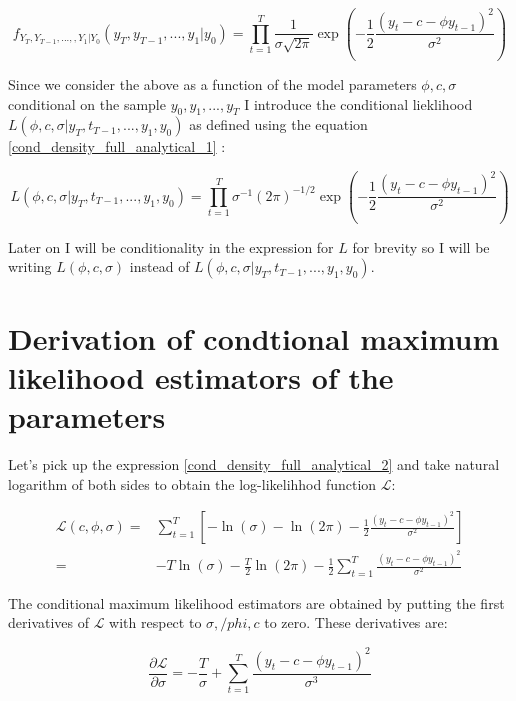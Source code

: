 \documentclass[12pt]{article}
\begin{document}
\begin{equation}
\label{cond_density_full_analytical_1}
f_{Y_T, Y_{T-1}, ..., ,Y_1 | Y_0}(y_T, y_{T-1}, ..., y_1 | y_0) = 
\prod_{t=1}^{T} \frac{1}{\sigma \sqrt{2\pi}} \exp \left(
-\frac{1}{2} \frac{(y_t - c - \phi y_{t-1})^2}{\sigma^2}
\right)
\end{equation}

Since we consider the above as a function of the model parameters 
$\phi, c, \sigma$ conditional on the sample $y_0, y_1, ..., y_T$ I introduce 
the conditional lieklihood $L(\phi, c, \sigma | y_T, t_{T-1}, ..., y_1, y_0)$ as defined 
using the equation \eqref{cond_density_full_analytical_1} :

\begin{equation}
\label{cond_density_full_analytical_2}
L(\phi, c, \sigma | y_T, t_{T-1}, ..., y_1, y_0) = 
\prod_{t=1}^{T} \sigma^{-1} (2\pi)^{-1/2} \exp \left(
-\frac{1}{2} \frac{(y_t - c -\phi y_{t-1})^2}{\sigma^2}
\right)
\end{equation}

Later on I will be conditionality in the expression for $L$ for brevity so I will 
be writing $L(\phi, c, \sigma)$ instead of 
$L(\phi, c, \sigma | y_T, t_{T-1}, ..., y_1, y_0)$.


\section{Derivation of condtional maximum likelihood estimators of the parameters}
Let's pick up the expression \eqref{cond_density_full_analytical_2} and take natural 
logarithm of both sides to obtain the log-likelihhod function $\mathcal{L}$:

\begin{eqnarray*}
\mathcal{L} (c, \phi, \sigma) 
=& 
\sum_{t = 1}^{T} \left[ 
- \ln (\sigma) - \ln (2 \pi) - \frac{1}{2} \frac{(y_t - c -\phi y_{t-1})^2}{\sigma^2}
\right] \\
=& 
- T \ln (\sigma) - \frac{T}{2} \ln (2 \pi) - 
\frac{1}{2} \sum_{t = 1}^{T}  \frac{(y_t - c -\phi y_{t-1})^2}{\sigma^2}
\end{eqnarray*}

The conditional maximum likelihood estimators are obtained by putting the first 
derivatives of $\mathcal{L}$ with respect to $\sigma, /phi, c$ to zero. These 
derivatives are:

\begin{equation}
\label{derivative_sigma}
\frac{\partial \mathcal{L}}{\partial \sigma} = 
- \frac{T}{\sigma} + \sum_{t = 1}^{T}  \frac{(y_t - c -\phi y_{t-1})^2}{\sigma^3}
\end{equation}
\end{document}
